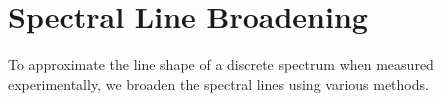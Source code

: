 \chapter{Spectral Line Broadening} %

\label{AppendixB} %



To approximate the line shape of a discrete spectrum when measured experimentally, we broaden the spectral lines using various methods.


